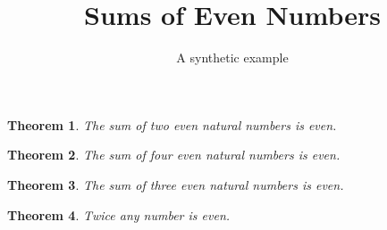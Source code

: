 \documentclass[11pt]{article}
\title{Sums of Even Numbers}
\author{A synthetic example}
\date{}
\newtheorem{theorem}{Theorem}
\begin{document}
\maketitle

\begin{theorem}\label{thm:two}
The sum of two even natural numbers is even.
\end{theorem}

\begin{theorem}\label{thm:four}
The sum of four even natural numbers is even.
\end{theorem}

\begin{theorem}\label{thm:three}
The sum of three even natural numbers is even.
\end{theorem}

\begin{theorem}\label{thm:double}
Twice any number is even.
\end{theorem}
\end{document}
